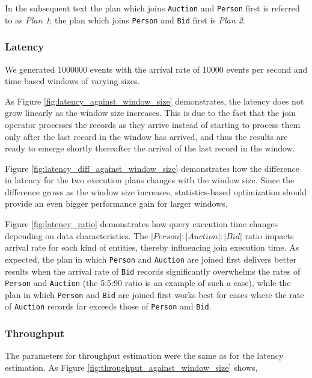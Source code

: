 In the subsequent text the plan which joins \texttt{Auction} and \texttt{Person} first is referred to as \textit{Plan 1}; the plan which joins \texttt{Person} and \texttt{Bid} first is \textit{Plan 2}.
\subsubsection{Latency}

We generated 1000000 events with the arrival rate of 10000 events per second and time-based windows of varying sizes.

As Figure \ref{fig:latency_against_window_size} demonstrates, the latency does not grow linearly as the window size increases. This is due to the fact that the join operator processes the records as they arrive instead of starting to process them only after the last record in the window has arrived, and thus the results are ready to emerge shortly thereafter the arrival of the last record in the window.

Figure \ref{fig:latency_diff_against_window_size} demonstrates how the difference in latency for the two execution plans changes with the window size. Since the difference grows as the window size increases, statistics-based optimization should provide an even bigger performance gain for larger windows.

Figure \ref{fig:latency_ratio} demonstrates how query execution time changes depending on data characteristics. The $|Person|:|Auction|:|Bid|$ ratio impacts arrival rate for each kind of entities, thereby influencing join execution time. As expected, the plan in which \texttt{Person} and \texttt{Auction} are joined first delivers better results when the arrival rate of \texttt{Bid} records significantly overwhelms the rates of \texttt{Person} and \texttt{Auction} (the 5:5:90 ratio is an example of such a case), while the plan in which \texttt{Person} and \texttt{Bid} are joined first works best for cases where the rate of \texttt{Auction} records far exceeds those of \texttt{Person} and \texttt{Bid}. 


\subsubsection{Throughput}

The parameters for throughput estimation were the same as for the latency estimation. As Figure \ref{fig:throughput_against_window_size} shows, 


